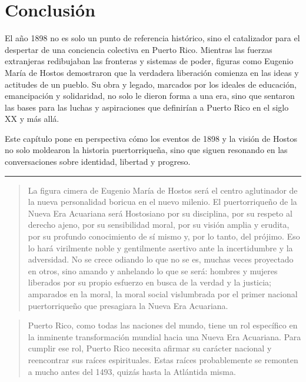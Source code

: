 \documentclass[
]{book}
\begin{document}
\section{Conclusión}\label{conclusiuxf3n}

El año 1898 no es solo un punto de referencia histórico, sino el catalizador para el despertar de una conciencia colectiva en Puerto Rico. Mientras las fuerzas extranjeras redibujaban las fronteras y sistemas de poder, figuras como Eugenio María de Hostos demostraron que la verdadera liberación comienza en las ideas y actitudes de un pueblo. Su obra y legado, marcados por los ideales de educación, emancipación y solidaridad, no solo le dieron forma a una era, sino que sentaron las bases para las luchas y aspiraciones que definirían a Puerto Rico en el siglo XX y más allá.

Este capítulo pone en perspectiva cómo los eventos de 1898 y la visión de Hostos no solo moldearon la historia puertorriqueña, sino que siguen resonando en las conversaciones sobre identidad, libertad y progreso.

\begin{center}\rule{0.5\linewidth}{0.5pt}\end{center}

\begin{quote}
La figura cimera de Eugenio María de Hostos será el centro aglutinador de la nueva personalidad boricua en el nuevo milenio. El puertorriqueño de la Nueva Era Acuariana será Hostosiano por su disciplina, por su respeto al derecho ajeno, por su sensibilidad moral, por su visión amplia y erudita, por su profundo conocimiento de sí mismo y, por lo tanto, del prójimo. Eso lo hará virilmente noble y gentilmente asertivo ante la incertidumbre y la adversidad. No se crece odiando lo que no se es, muchas veces proyectado en otros, sino amando y anhelando lo que se será: hombres y mujeres liberados por su propio esfuerzo en busca de la verdad y la justicia; amparados en la moral, la moral social vislumbrada por el primer nacional puertorriqueño que presagiara la Nueva Era Acuariana.
\end{quote}

\begin{quote}
Puerto Rico, como todas las naciones del mundo, tiene un rol específico en la inminente transformación mundial hacia una Nueva Era Acuariana. Para cumplir ese rol, Puerto Rico necesita afirmar su carácter nacional y reencontrar sus raíces espirituales. Estas raíces probablemente se remonten a mucho antes del 1493, quizás hasta la Atlántida misma.
\end{quote}
\end{document}
